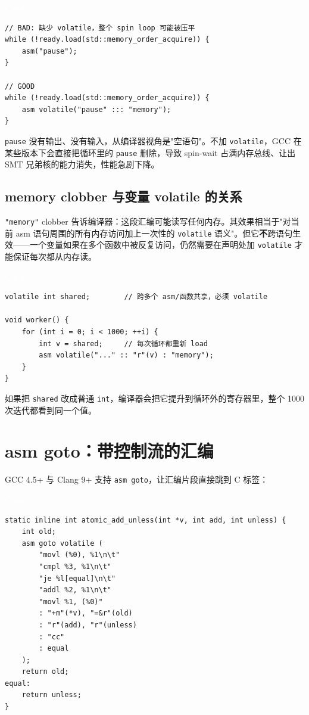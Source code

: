 \documentclass[12pt,a4paper,fontset=fandol]{ctexbook}
\newcommand{\cpplabel}{%
  \begin{tcolorbox}[enhanced,colback=cppheadbg,colframe=cppheadbg,
    arc=1mm,boxrule=0mm,left=6pt,right=6pt,top=2pt,bottom=2pt,
    halign=left,oversize]
    \textcolor{white}{\small\bfseries C++}
  \end{tcolorbox}\vspace{-4pt}}
\newcommand{\kw}[1]{\texttt{#1}}
\begin{document}
\cpplabel
\begin{lstlisting}[style=cppstyle]
// BAD: 缺少 volatile，整个 spin loop 可能被压平
while (!ready.load(std::memory_order_acquire)) {
    asm("pause");
}

// GOOD
while (!ready.load(std::memory_order_acquire)) {
    asm volatile("pause" ::: "memory");
}
\end{lstlisting}

\texttt{pause} 没有输出、没有输入，从编译器视角是"空语句"。不加 \kw{volatile}，GCC 在某些版本下会直接把循环里的 \texttt{pause} 删除，导致 spin-wait 占满内存总线、让出 SMT 兄弟核的能力消失，性能急剧下降。

\subsection{memory clobber 与变量 volatile 的关系}\label{sec:asm-memory-clobber}

\texttt{"memory"} clobber 告诉编译器：这段汇编可能读写任何内存。其效果相当于"对当前 asm 语句周围的所有内存访问加上一次性的 \kw{volatile} 语义"。但它\textbf{不}跨语句生效——一个变量如果在多个函数中被反复访问，仍然需要在声明处加 \kw{volatile} 才能保证每次都从内存读。

\cpplabel
\begin{lstlisting}[style=cppstyle]
volatile int shared;        // 跨多个 asm/函数共享，必须 volatile

void worker() {
    for (int i = 0; i < 1000; ++i) {
        int v = shared;     // 每次循环都重新 load
        asm volatile("..." :: "r"(v) : "memory");
    }
}
\end{lstlisting}

如果把 \texttt{shared} 改成普通 \texttt{int}，编译器会把它提升到循环外的寄存器里，整个 1000 次迭代都看到同一个值。

\section{asm goto：带控制流的汇编}\label{sec:asm-goto}

GCC 4.5+ 与 Clang 9+ 支持 \texttt{asm goto}，让汇编片段直接跳到 C 标签：

\cpplabel
\begin{lstlisting}[style=cppstyle]
static inline int atomic_add_unless(int *v, int add, int unless) {
    int old;
    asm goto volatile (
        "movl (%0), %1\n\t"
        "cmpl %3, %1\n\t"
        "je %l[equal]\n\t"
        "addl %2, %1\n\t"
        "movl %1, (%0)"
        : "+m"(*v), "=&r"(old)
        : "r"(add), "r"(unless)
        : "cc"
        : equal
    );
    return old;
equal:
    return unless;
}
\end{lstlisting}
\end{document}
